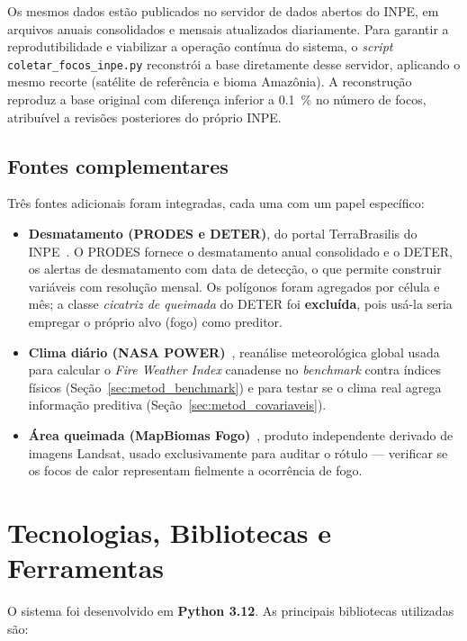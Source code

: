 \documentclass[tcc2]{uftex}
\begin{document}
Os mesmos dados estão publicados no servidor de dados abertos do INPE, em arquivos anuais consolidados e mensais atualizados diariamente. Para garantir a reprodutibilidade e viabilizar a operação contínua do sistema, o \emph{script} \texttt{coletar\_focos\_inpe.py} reconstrói a base diretamente desse servidor, aplicando o mesmo recorte (satélite de referência e bioma Amazônia). A reconstrução reproduz a base original com diferença inferior a \SI{0,1}{\percent} no número de focos, atribuível a revisões posteriores do próprio INPE.

\subsection{Fontes complementares}

Três fontes adicionais foram integradas, cada uma com um papel específico:

\begin{itemize}
  \item \textbf{Desmatamento (PRODES e DETER)}, do portal TerraBrasilis do INPE~\cite{terrabrasilisprodes}. O PRODES fornece o desmatamento anual consolidado e o DETER, os alertas de desmatamento com data de detecção, o que permite construir variáveis com resolução mensal. Os polígonos foram agregados por célula e mês; a classe \emph{cicatriz de queimada} do DETER foi \textbf{excluída}, pois usá-la seria empregar o próprio alvo (fogo) como preditor.
  \item \textbf{Clima diário (NASA POWER)}~\cite{nasapower}, reanálise meteorológica global usada para calcular o \emph{Fire Weather Index} canadense no \emph{benchmark} contra índices físicos (Seção~\ref{sec:metod_benchmark}) e para testar se o clima real agrega informação preditiva (Seção~\ref{sec:metod_covariaveis}).
  \item \textbf{Área queimada (MapBiomas Fogo)}~\cite{mapbiomasfogo}, produto independente derivado de imagens Landsat, usado exclusivamente para auditar o rótulo --- verificar se os focos de calor representam fielmente a ocorrência de fogo.
\end{itemize}

\section{Tecnologias, Bibliotecas e Ferramentas}
\label{sec:metod_tecnologias}

O sistema foi desenvolvido em \textbf{Python 3.12}. As principais bibliotecas utilizadas são:
\end{document}
